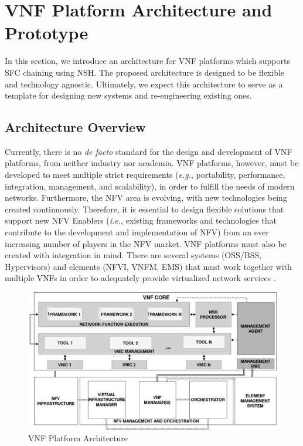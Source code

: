 \section{VNF Platform Architecture and Prototype} \label{ARCH}

In this section, we introduce an architecture for VNF platforms which supports SFC chaining using NSH. The proposed architecture is designed to be flexible and technology agnostic. Ultimately, we expect this architecture to serve as a template for designing new systems and re-engineering existing ones.

\subsection{Architecture Overview}

Currently, there is no \textit{de facto} standard for the design and development of VNF platforms, from neither industry nor academia. VNF platforms, however, must be developed to meet multiple strict requirements (\textit{e.g.}, portability, performance, integration, management, and scalability), in order to fulfill the needs of modern networks. Furthermore, the NFV area is evolving, with new technologies being created continuously. Therefore, it is essential to design flexible solutions that support new NFV Enablers (\textit{i.e.}, existing frameworks and technologies that contribute to the development and implementation of NFV) from an ever increasing number of players in the NFV market. VNF platforms must also be created with integration in mind. There are several systems (OSS/BSS, Hypervisors) and elements (NFVI, VNFM, EMS) that must work together with multiple VNFs in order to adequately provide virtualized network services \cite{GS-2014}. %


\begin{figure}[!ht]
    \centering
    \includegraphics[width=\textwidth]{images/FullArchitecture_MOD.png}
    \caption{\label{vnfGeneric} VNF Platform Architecture}
\end{figure}

